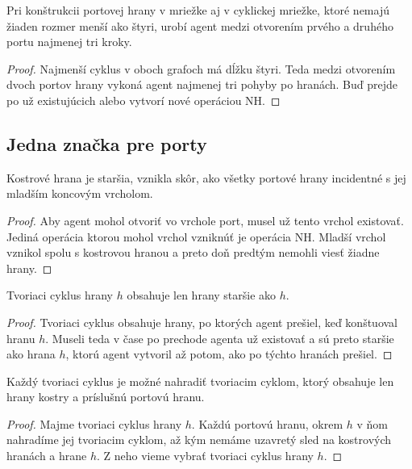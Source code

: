 \begin{lem}
Pri konštrukcii portovej hrany v mriežke aj v cyklickej mriežke, ktoré
nemajú žiaden rozmer menší ako štyri, 
urobí agent medzi otvorením prvého a druhého
portu najmenej tri kroky.
\end{lem}
\begin{proof}
Najmenší cyklus v oboch grafoch má dĺžku štyri. 
Teda medzi otvorením dvoch portov
hrany vykoná agent najmenej tri pohyby po hranách. Buď prejde po už
existujúcich alebo vytvorí nové operáciou NH.
\end{proof}

\subsection{Jedna značka pre porty}

\begin{lem}
Kostrové hrana je staršia, vznikla skôr, ako všetky portové hrany incidentné
s jej mladším koncovým vrcholom.
\end{lem}
\begin{proof}
Aby agent mohol otvoriť vo vrchole port, musel už tento vrchol existovať.
Jediná operácia ktorou mohol vrchol vzniknúť je operácia NH. Mladší vrchol
vznikol spolu s kostrovou hranou a preto doň predtým nemohli viesť žiadne
hrany.
\end{proof}


\begin{lem}
Tvoriaci cyklus hrany $h$ obsahuje len hrany staršie ako $h$.
\end{lem}
\begin{proof}
Tvoriaci cyklus obsahuje hrany, po ktorých agent prešiel, keď konštuoval
hranu $h$. Museli teda v čase po prechode agenta už existovať a sú preto 
staršie ako hrana $h$, ktorú agent vytvoril až potom, ako po týchto hranách
prešiel.
\end{proof}


\begin{lem}
\label{cyklus}
Každý tvoriaci cyklus je možné nahradiť tvoriacim cyklom, ktorý obsahuje len
hrany kostry a príslušnú portovú hranu.
\end{lem}
\begin{proof}
Majme tvoriaci cyklus hrany $h$. Každú portovú hranu, okrem $h$  v ňom nahradíme 
jej tvoriacim
cyklom, až kým nemáme uzavretý sled na kostrových hranách a hrane $h$. Z
neho vieme vybrať tvoriaci cyklus hrany $h$.
\end{proof}



